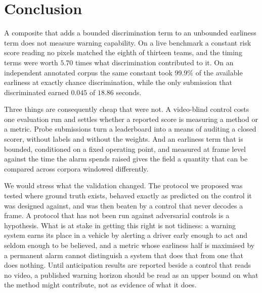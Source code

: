 \section{Conclusion}
\label{sec:conclusion}

A composite that adds a bounded discrimination term to an unbounded earliness
term does not measure warning capability. On a live benchmark a constant risk
score reading no pixels matched the eighth of thirteen teams, and the timing
terms were worth $5.70$ times what discrimination contributed to it. On an
independent annotated corpus the same constant took 99.9\% of the available
earliness at exactly chance discrimination, while the only submission that
discriminated earned $0.045$ of $18.86$ seconds.

Three things are consequently cheap that were not. A video-blind control costs
one evaluation run and settles whether a reported score is measuring a method
or a metric. Probe submissions turn a leaderboard into a means of auditing a
closed scorer, without labels and without the weights. And an earliness term
that is bounded, conditioned on a fixed operating point, and measured at frame
level against the time the alarm spends raised gives the field a quantity that
can be compared across corpora windowed differently.

We would stress what the validation changed. The protocol we proposed was
tested where ground truth exists, behaved exactly as predicted on the control
it was designed against, and was then beaten by a control that never decodes a
frame. A protocol that has not been run against adversarial controls is a
hypothesis. What is at stake in getting this right is not tidiness: a warning
system earns its place in a vehicle by alerting a driver early enough to act
and seldom enough to be believed, and a metric whose earliness half is
maximised by a permanent alarm cannot distinguish a system that does that from
one that does nothing. Until anticipation results are reported beside a control
that reads no video, a published warning horizon should be read as an upper
bound on what the method might contribute, not as evidence of what it does.
